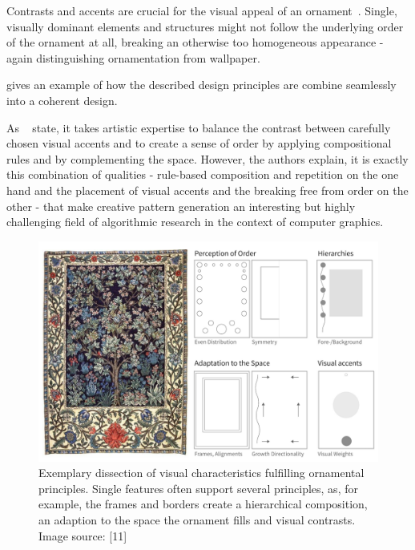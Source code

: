 Contrasts and accents are crucial for the visual appeal of an ornament~\cite{wong_1998_cgf,ward_1896_tpo, moughtin_1999_udo}. Single, visually dominant elements and structures might not follow the underlying order of the ornament at all, breaking an otherwise too homogeneous appearance - again distinguishing ornamentation from wallpaper.

 gives an example of how the described design principles are combine seamlessly into a coherent design.

As \citeauthor*{gieseke_2017_ooo}~\cite{gieseke_2017_ooo} state, it takes artistic expertise to balance the contrast between carefully chosen visual accents and to create a sense of order by applying compositional rules and by complementing the space. However, the authors explain, it is exactly this combination of qualities - rule-based composition and repetition on the one hand and the placement of visual accents and the breaking free from order on the other - that make creative pattern generation an interesting but highly challenging field of algorithmic research in the context of computer graphics.


\begin{figure}
       \includegraphics[width=1\columnwidth]{figures/ornament/ornament_principles.jpg}
               \caption[Ornamentation principles]{\label{fig:ornamentation_principles} Exemplary dissection of visual characteristics fulfilling ornamental principles. Single features often support several principles, as, for example, the frames and borders create a hierarchical composition, an adaption to the space the ornament fills and visual contrasts. Image source:  [11]}
\end{figure}

